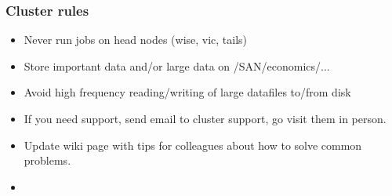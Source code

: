 \documentclass{beamer}
\begin{document}
\begin{frame}
\frametitle{Cluster rules}
\begin{itemize}
\item Never run jobs on head nodes (wise, vic, tails)
\item Store important data and/or large data on /SAN/economics/...
\item Avoid high frequency reading/writing of large datafiles to/from disk
\item If you need support, send email to cluster support, go visit them in person.
\item Update wiki page with tips for colleagues about how to solve common problems.
\item 
\end{itemize}
\end{frame}
\end{document}
